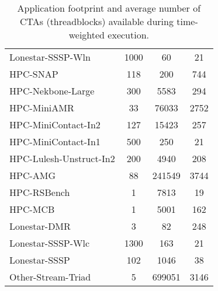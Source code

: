 \begin{table}[t]
\begin{small}
\begin{tabular}{lccc}
Lonestar-SSSP-Wln & 1000 & 60 & 21 \\
HPC-SNAP & 118 & 200 & 744 \\
HPC-Nekbone-Large & 300 & 5583 & 294 \\
HPC-MiniAMR & 33 & 76033 & 2752 \\
HPC-MiniContact-In2 & 127 & 15423 & 257 \\
HPC-MiniContact-In1 & 500 & 250 & 21 \\
HPC-Lulesh-Unstruct-In2 & 200 & 4940 & 208 \\
HPC-AMG & 88 & 241549 & 3744 \\
HPC-RSBench & 1 & 7813 & 19 \\
HPC-MCB & 1 & 5001 & 162 \\
Lonestar-DMR & 3 & 82 & 248 \\
Lonestar-SSSP-Wlc & 1300 & 163 & 21 \\
Lonestar-SSSP & 102 & 1046 & 38 \\
Other-Stream-Triad & 5 & 699051 & 3146 \\
\toprule
\end{tabular}
\caption{Application footprint and average number of CTAs (threadblocks) 
available during time-weighted execution.}
\label{tab:numctas}
\end{small}
\end{table}
